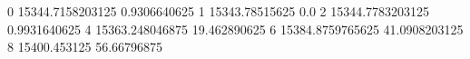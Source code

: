 0 15344.7158203125 0.9306640625
1 15343.78515625 0.0
2 15344.7783203125 0.9931640625
4 15363.248046875 19.462890625
6 15384.8759765625 41.0908203125
8 15400.453125 56.66796875
